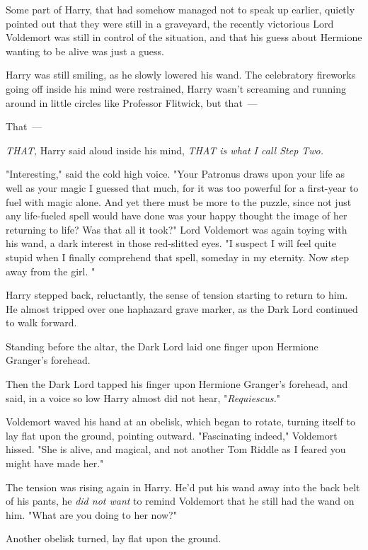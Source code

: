 Some part of Harry, that had somehow managed not to speak up earlier, quietly
pointed out that they were still in a graveyard, the recently victorious Lord
Voldemort was still in control of the situation, and that his guess about
Hermione wanting to be alive was just a guess.

Harry was still smiling, as he slowly lowered his wand. The celebratory
fireworks going off inside his mind were restrained, Harry wasn't screaming and
running around in little circles like Professor Flitwick, but that~---

That~---

\emph{THAT,} Harry said aloud inside his mind, \emph{THAT is what I call Step
Two.}

"Interesting," said the cold high voice. "Your Patronus draws upon your life as
well as your magic{\el} I guessed that much, for it was too powerful for a
first-year to fuel with magic alone. And yet there must be more to the puzzle,
since not just any life-fueled spell would have done{\el} was your happy
thought the image of her returning to life? Was that all it took?" Lord
Voldemort was again toying with his wand, a dark interest in those red-slitted
eyes. "I suspect I will feel quite stupid when I finally comprehend that spell,
someday in my eternity. Now step away from the girl. "

Harry stepped back, reluctantly, the sense of tension starting to return to
him. He almost tripped over one haphazard grave marker, as the Dark Lord
continued to walk forward.

Standing before the altar, the Dark Lord laid one finger upon Hermione
Granger's forehead.

Then the Dark Lord tapped his finger upon Hermione Granger's forehead, and
said, in a voice so low Harry almost did not hear, "\emph{Requiescus.}"

Voldemort waved his hand at an obelisk, which began to rotate, turning itself
to lay flat upon the ground, pointing outward. "Fascinating indeed," Voldemort
hissed. "She is alive, and magical, and not another Tom Riddle as I feared you
might have made her."

The tension was rising again in Harry. He'd put his wand away into the back
belt of his pants, he \emph{did not want} to remind Voldemort that he still had
the wand on him. "What are you doing to her now?"

Another obelisk turned, lay flat upon the ground. 


